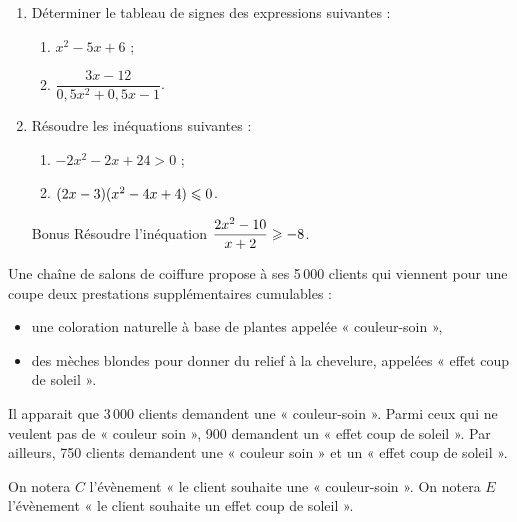 \documentclass[a4paper,11pt]{article}
\begin{document}
\bigskip


\begin{enumerate}
	\item Déterminer le tableau de signes des expressions suivantes :
	\begin{enumerate}
		\item $x^2-5x+6$ ;
		\item $\dfrac{3x-12}{0,5x^2+0,5x-1}$.
	\end{enumerate}
	\item Résoudre les inéquations suivantes :
	\begin{enumerate}
		\item $-2x^2-2x+24 > 0$ ;
		\item $(2x-3)(x^2-4x+4) \leqslant 0$.
	\end{enumerate}
	\item[Bonus] Résoudre l'inéquation $\dfrac{2x^2-10}{x+2} \geqslant -8$.
\end{enumerate}

\newpage


\medskip

Une chaîne de salons de coiffure propose à ses 5\,000 clients qui viennent pour une coupe deux prestations supplémentaires cumulables : 
\begin{itemize}
	\item une coloration naturelle à base de plantes appelée « couleur-soin »,
	\item des mèches blondes pour donner du relief à la chevelure, appelées « effet coup de soleil ». 
\end{itemize}
Il apparait que 3\,000 clients demandent une « couleur-soin ». Parmi ceux qui ne veulent pas de « couleur soin », 900 demandent un « effet coup de soleil ». Par ailleurs, 750 clients demandent une « couleur soin » et un « effet coup de soleil ». 

On notera $C$ l’évènement « le client souhaite une « couleur-soin ». 
On notera $E$ l’évènement « le client souhaite un effet coup de soleil ». 
\end{document}
